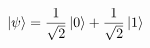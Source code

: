 \documentclass[preview]{standalone}
\begin{document}
\begin{align*}
\ket{\psi} = \frac{1}{\sqrt{2}} \ket{0} + \frac{1}{\sqrt{2}} \ket{1}
\end{align*}
\end{document}

